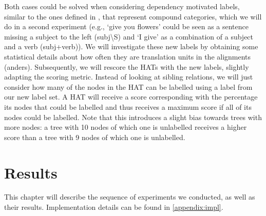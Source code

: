 \documentclass{report}
\theoremstyle{definition}
\theoremstyle{plain}
\begin{document}
Both cases could be solved when considering dependency motivated labels, similar to the ones defined in \cite{zollmann2006syntax}, that represent compound categories, which we will do in a second experiment (e.g., `give you flowers' could be seen as a sentence missing a subject to the left (subj\textbackslash S) and `I give' as a combination of a subject and a verb (subj+verb)). We will investigate these new labels by obtaining some statistical details about how often they are translation units in the alignments (anders). Subsequently, we will rescore the HATs with the new labels, slightly adapting the scoring metric. Instead of looking at sibling relations, we will just consider how many of the nodes in the HAT can be labelled using a label from our new label set. A HAT will receive a score corresponding with the percentage its nodes that could be labelled and thus receives a maximum score if all of its nodes could be labelled. Note that this introduces a slight bias towards trees with more nodes: a tree with 10 nodes of which one is unlabelled receives a higher score than a tree with 9 nodes of which one is unlabelled. %




%
%


\chapter{Results}

This chapter will describe the sequence of experiments we conducted, as well as their results. Implementation details can be found in \ref{appendix:impl}. 




\end{document}
